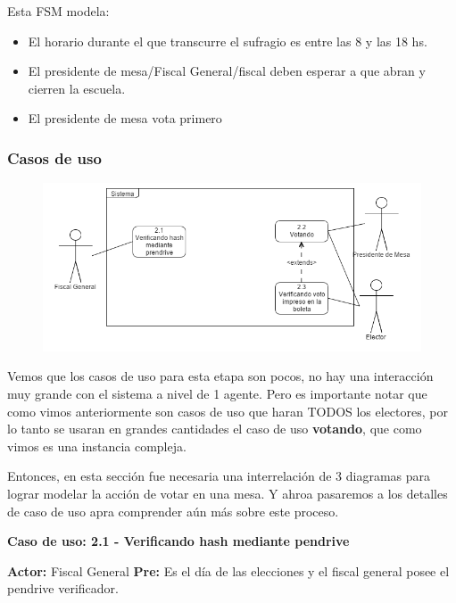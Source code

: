 Esta FSM modela:
\begin{itemize}
\item El horario durante el que transcurre el sufragio es entre las 8 y las 18 hs.
\item El presidente de mesa/Fiscal General/fiscal deben esperar a que abran y cierren la escuela.
\item El presidente de mesa vota primero

\end{itemize}

\newpage

\subsubsection{Casos de uso}

\begin{figure}[h!]
  \begin{center}
    \includegraphics[scale=0.45]{imagenes/CU/casosdeusosufragio.png}
  \end{center}
\end{figure}

Vemos que los casos de uso para esta etapa son pocos, no hay una interacción muy grande con el sistema a nivel de 1 agente. Pero es importante notar que como vimos anteriormente son casos de uso que haran TODOS los electores, por lo tanto se usaran en grandes cantidades el caso de uso \textbf{votando}, que como vimos es una instancia compleja.

Entonces, en esta sección fue necesaria una interrelación de 3 diagramas para lograr modelar la acción de votar en una mesa. Y ahroa pasaremos a los detalles de caso de uso apra comprender aún más sobre este proceso.

\newpage

\textbf{Caso de uso: 2.1 - Verificando hash mediante pendrive}

\textbf{Actor:} Fiscal General
\textbf{Pre:} Es el día de las elecciones y el fiscal general posee el pendrive verificador.

